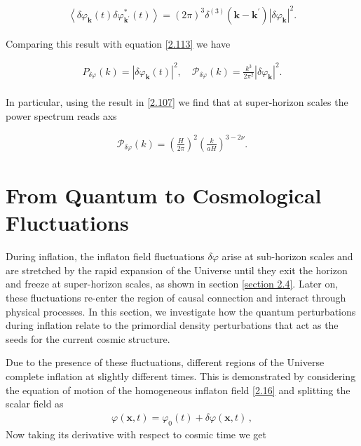 \begin{align}
    \left\langle\delta \varphi_{\mathbf{k}}(t) \delta \varphi_{\mathbf{k}^{\prime}}^{*}(t)\right\rangle=(2 \pi)^{3} \delta^{(3)}\left(\mathbf{k}-\mathbf{k}^{\prime}\right)\left|\delta \varphi_{\mathbf{k}}\right|^{2} .\label{2.124}
\end{align}

Comparing this result with equation \ref{2.113} we have 

\begin{align}
    P_{\delta \varphi}(k)=\left|\delta \varphi_{\mathbf{k}}(t)\right|^{2}, \quad \mathcal{P}_{\delta \varphi}(k)=\frac{k^{3}}{2 \pi^{2}}\left|\delta \varphi_{\mathbf{k}}\right|^{2} .\label{2.125}
\end{align}\\

In particular, using the result in \ref{2.107} we find that at super-horizon scales the power spectrum reads axs

\begin{align}
    \mathcal{P}_{\delta \varphi}(k)=\left(\frac{H}{2 \pi}\right)^{2}\left(\frac{k}{a H}\right)^{3-2 \nu} .\label{2.126}
\end{align}

\section{From Quantum to Cosmological Fluctuations}
During inflation, the inflaton field fluctuations $\delta \varphi$ arise at sub-horizon scales and are stretched by the rapid expansion of the Universe until they exit the horizon and freeze at super-horizon scales, as shown in section \ref{section 2.4}. Later on, these fluctuations re-enter the region of causal connection and interact through physical processes. In this section, we investigate how the quantum perturbations during inflation relate to the primordial density perturbations that act as the seeds for the current cosmic structure.

Due to the presence of these fluctuations, different regions of the Universe complete inflation at slightly different times. This is demonstrated by considering the equation of motion of the homogeneous inflaton field \ref{2.16} and splitting the scalar field as 
\begin{align}
    \varphi (\mathbf{x}, t) = \varphi_0 (t) + \delta \varphi (\mathbf{x}, t)
    \,, \label{2.127}
\end{align}
Now taking its derivative with respect to cosmic time we get

